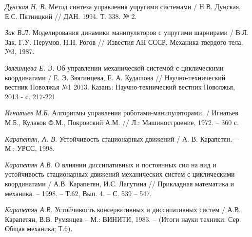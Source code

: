 \begin{thebibliography}{10}
	{\it Дунская Н. В.} Метод синтеза управления упругими системами / Н.В. Дунская, Е.С. Пятницкий // ДАН. 1994. Т. 338. № 2.
	
	{\it Зак В.Л.} Моделирования динамики манипуляторов с упругими шарнирами / В.Л. Зак, Г.У. Перумов, Н.Н. Рогов // Известия АН СССР, Механика твердого тела, №3, 1987.
	
	{\it Звягинцева Е. Э.} Об управлении механической системой с циклическими координатами / Е. Э. Звягинцева, Е. А. Кудашова //
	Научно-технический вестник Поволжья №1 2013. Казань: Научно-технический вестник Поволжья, 2013 - с. 217-221
	
	{\it Игнатьев М.Б.} Алгоритмы управления роботами-манипуляторами. / Игнатьев М.Б., Кулаков Ф.М., Покровский А.М. //  Л.: Машиностроение, 1972. – 	360 с.
	
	{\it Карапетян, А. В.} Устойчивость стационарных движений / А. В. Карапетян.—
	М.: УРСС, 1998.
	
	{\it Карапетян А.В.} О влиянии диссипативных и постоянных сил на вид и устойчивость стационарных движений механических систем с циклическими 		координатами / А.В. Карапетян, И.С. Лагутина // Прикладная математика и механика. – 1998. – Т.62, Вып. 4. – С. 539 – 547.

	{\it Карапетян А.В.} Устойчивость консервативных и диссипативных систем / А.В. Карапетян, В.В. Румянцев – М.: ВИНИТИ, 1983. – (Итоги науки  		техники. Сер. Общая механика; Т.6).
	

\end{thebibliography}
